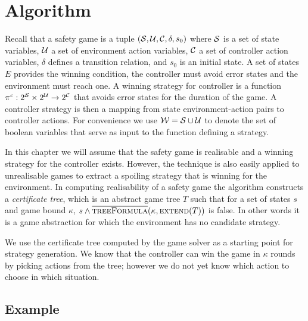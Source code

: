 \section{Algorithm}

Recall that a safety game is a tuple $(\mathcal{S}, \mathcal{U}, \mathcal{C}, \delta, s_0)$ where $\mathcal{S}$ is a set of state variables, $\mathcal{U}$ a set of environment action variables, $\mathcal{C}$ a set of controller action variables, $\delta$ defines a transition relation, and $s_0$ is an initial state. A set of states $E$ provides the winning condition, the controller must avoid error states and the environment must reach one. A winning strategy for controller is a function $\pi^c : 2^{\mathcal{S}} \times 2^{\mathcal{U}} \to 2^{\mathcal{C}}$ that avoids error states for the duration of the game. A controller strategy is then a mapping from state environment-action pairs to controller actions. For convenience we use $\mathcal{W} = \mathcal{S} \cup \mathcal{U}$ to denote the set of boolean variables that serve as input to the function defining a strategy.

In this chapter we will assume that the safety game is realisable and a winning strategy for the controller exists. However, the technique is also easily applied to unrealisable games to extract a spoiling strategy that is winning for the environment. In computing realisability of a safety game the algorithm constructs a \emph{certificate tree}, which is an abstract game tree $T$ such that for a set of states $s$ and game bound $\kappa$, $s \land \textsc{$\overline{\mbox{treeFormula}}$}(\kappa, \textsc{extend}(T))$ is false. In other words it is a game abstraction for which the environment has no candidate strategy.

We use the certificate tree computed by the game solver as a starting point for strategy generation.  We know that the controller can win the game in $\kappa$ rounds by picking actions from the tree; however we do not yet know which action to choose in which situation.


\subsection{Example}

